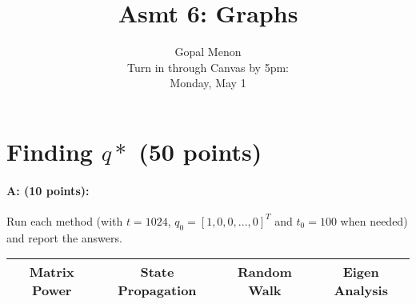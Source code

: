\documentclass[11pt]{article}
\title{Asmt 6: Graphs}
\author{Gopal Menon\\Turn in through Canvas by 5pm: \\
Monday, May 1}
\date{}
\begin{document}
\maketitle


%
\section{Finding $q*$ (50 points)}
\paragraph{A: (10 points):} 
Run each method (with $t = 1024$, $q_0 = [1, 0, 0, . . ., 0]^T$ and $t_0 = 100$ when needed) and report the answers.

    \begin{table}[!h] 
    \centering
    \label{6A}
    \begin{tabular}{|c|c|c|c|}
      \hline
    Matrix Power & State Propagation & Random Walk & Eigen Analysis  \\
      \hline        
      

\end{tabular}
\end{table}
\end{document}
